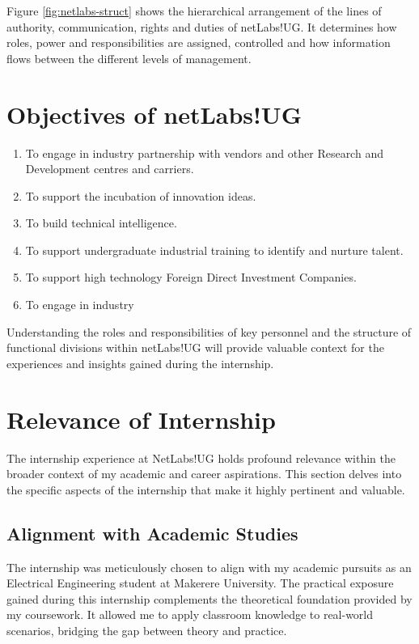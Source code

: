Figure \ref{fig:netlabs-struct} shows the hierarchical arrangement of the lines of authority, communication, rights and duties of netLabs!UG. It determines how roles, power and responsibilities are assigned, controlled and how information flows between the different
levels of management.

\section{Objectives of netLabs!UG}
\begin{enumerate}
    \item To engage in industry partnership with vendors and other Research and Development centres and carriers.
    \item To support the incubation of innovation ideas.
    \item To build technical intelligence.
    \item To support undergraduate industrial training to identify and nurture talent.
    \item To support high technology Foreign Direct Investment Companies.
    \item To engage in industry
\end{enumerate}

Understanding the roles and responsibilities of key personnel and the structure of functional divisions within netLabs!UG will provide valuable context for the experiences and insights gained during the internship.

\section{Relevance of Internship}

The internship experience at NetLabs!UG holds profound relevance within the broader context of my academic and career aspirations. This section delves into the specific aspects of the internship that make it highly pertinent and valuable.

\subsection{Alignment with Academic Studies}

The internship was meticulously chosen to align with my academic pursuits as an Electrical Engineering student at Makerere University. The practical exposure gained during this internship complements the theoretical foundation provided by my coursework. It allowed me to apply classroom knowledge to real-world scenarios, bridging the gap between theory and practice.

